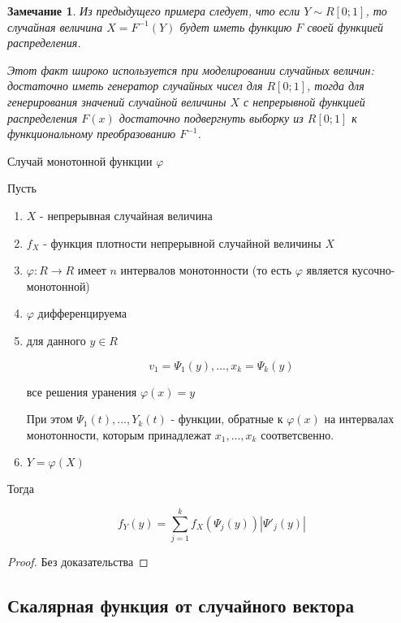 \documentclass[a4paper, 14pt]{report}
\newtheorem{note}{Замечание}[section]
\begin{document}
\begin{note}
    Из предыдущего примера следует, что если $Y \sim R[0;1]$, то случайная величина $X = F^{-1}(Y)$ будет иметь функцию $F$ своей функцией распределения.

    Этот факт широко используется при моделировании случайных величин: достаточно иметь генератор случайных чисел для $R[0;1]$, тогда для генерирования значений случайной величины $X$ с непрерывной функцией распределения $F(x)$ достаточно подвергнуть выборку из $R[0;1]$ к функциональному преобразованию $F^{-1}$.
\end{note}

\begin{theorem}
    Случай монотонной функции $\varphi$

    Пусть

    \begin{enumerate}
        \item $X$ - непрерывная случайная величина
        \item $f_X$ - функция плотности непрерывной случайной величины $X$
        \item $\varphi : R \to R$ имеет $n$ интервалов монотонности (то есть $\varphi$ является кусочно-монотонной)
        \item $\varphi$ дифференцируема
        \item для данного $y \in R$

            $$
            v_1 = \Psi_1(y), ..., x_k = \Psi_k(y)
            $$

            все решения уранения $\varphi(x) = y$

            При этом $\Psi_1(t),...,Y_k(t)$ - функции, обратные к $\varphi(x)$ на интервалах монотонности, которым принадлежат $x_1,...,x_k$ соответсвенно.

        \item $Y = \varphi(X)$
    \end{enumerate}

    Тогда

    $$
    f_Y(y) = \sum_{j=1}^k f_X(\Psi_j(y))|\Psi'_j(y)|
    $$
\end{theorem}

\begin{proof}
    Без доказательства
\end{proof}

\subsection{Скалярная функция от случайного вектора}
\end{document}
